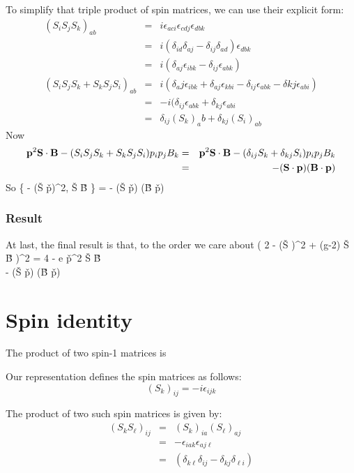 To simplify that triple product of spin matrices, we can use their explicit form:
\begin{eqnarray*}
	(S_i S_j S_k )_{ab}
		&=&	i\epsilon_{aci}\epsilon_{cdj}\epsilon_{dbk}	\\
		&=&	i(\delta_{id} \delta_{aj} - \delta_{ij} \delta_{ad})\epsilon_{dbk}	\\
		&=&	i(\delta_{aj} \epsilon_{ibk} - \delta_{ij} \epsilon_{abk})		\\
	(S_i S_j S_k + S_k S_j S_i)_{ab}
		&=& i(\delta_aj \epsilon_{ibk} + \delta_{aj} \epsilon_{kbi} -\delta_{ij} \epsilon_{abk} -\delta{kj}\epsilon_{abi})	\\
		&=& -i(\delta_{ij} \epsilon_{abk} + \delta_{kj} \epsilon_{abi}	\\
		&=&	\delta_{ij} {(S_k)}_ab + \delta_{kj} {(S_i)}_{ab}	
\end{eqnarray*}
Now 
\begin{eqnarray*}
 \mathbf{p}^2 \mathbf{S} \cdot \mathbf{B} - (S_i S_j S_k + S_k S_j S_i) p_i p_j B_k
 	&=& \mathbf{p}^2 \mathbf{S} \cdot \mathbf{B} - (\delta_{ij} S_k + \delta_{kj} S_i	) p_i p_j B_k	\\
 	&=& - (\mathbf{S} \cdot \mathbf{p}) (\mathbf{B} \cdot \mathbf{p})
\end{eqnarray*}
So
\beq \label{eq:A:SBanticom}
	\left \{  - (\v{S} \cdot \v{p})^2, \v{S} \cdot \v{B} \right \}
	 =
	 - (\v{S} \cdot \v{p}) (\v{B} \cdot \v{p})
\eeq

\subsubsection*{Result}
At last, the final result is that, to the order we care about 
\beq \label{eq:A:crossterm}
	\left(   {2} -  (\v{S} \cdot \gv{\pi})^2 + (g-2) \v{S} \cdot \v{B} \right )^2 
	=	 {4}  -  e \v{p}^2  \v{S} \cdot \v{B} \\
		 - (\v{S} \cdot \v{p}) (\v{B} \cdot \v{p})
\eeq





\section{Spin identity}
The product of two spin-1 matrices is

Our representation defines the spin matrices as follows:
$${(S_k)}_{ij}=-i \epsilon_{ijk}$$



The product of two such spin matrices is given by:
\begin{eqnarray*}
{(S_k S_\ell)}_{ij} 
	& = & {(S_k)}_{ia} {(S_\ell)}_{aj} \\
	& = & -\epsilon_{iak} \epsilon_{aj\ell} \\
	& = & (\delta_{k\ell} \delta_{ij} - \delta_{kj} \delta_{\ell i} )
\end{eqnarray*}


